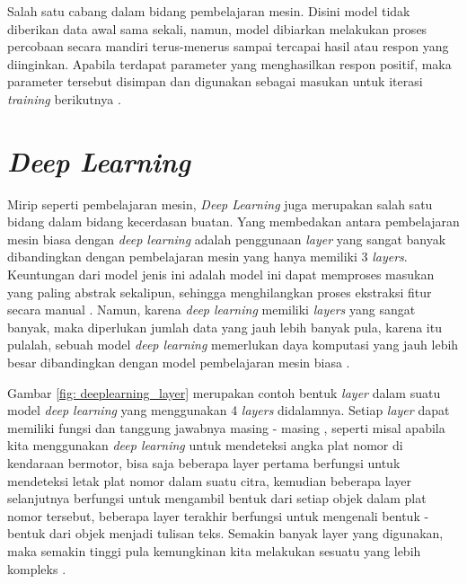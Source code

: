 Salah satu cabang dalam bidang pembelajaran mesin. Disini model tidak diberikan data awal sama sekali, namun, model dibiarkan melakukan proses percobaan secara mandiri terus-menerus sampai tercapai hasil atau respon yang diinginkan. Apabila terdapat parameter yang menghasilkan respon positif, maka parameter tersebut disimpan dan digunakan sebagai masukan untuk iterasi \textit{training} berikutnya \cite{mit_ml_expl}.

\section{\textit{Deep Learning}}

Mirip seperti pembelajaran mesin, \textit{Deep Learning} juga merupakan salah satu bidang dalam bidang kecerdasan buatan. Yang membedakan antara pembelajaran mesin biasa dengan \textit{deep learning} adalah penggunaan \textit{layer} yang sangat banyak dibandingkan dengan pembelajaran mesin yang hanya memiliki 3 \textit{layers}. Keuntungan dari model jenis ini adalah model ini dapat memproses masukan yang paling abstrak sekalipun, sehingga menghilangkan proses ekstraksi fitur secara manual \cite{mathwork_deeplearning}. Namun, karena \textit{deep learning} memiliki \textit{layers} yang sangat banyak, maka diperlukan jumlah data yang jauh lebih banyak pula, karena itu pulalah, sebuah model \textit{deep learning} memerlukan daya komputasi yang jauh lebih besar dibandingkan dengan model pembelajaran mesin biasa \cite{mit_ml_expl}.

Gambar \ref{fig: deeplearning_layer} merupakan contoh bentuk \textit{layer} dalam suatu model \textit{deep learning} yang menggunakan 4 \textit{layers} didalamnya. Setiap \textit{layer} dapat memiliki fungsi dan tanggung jawabnya masing - masing \cite{mit_ml_expl}, seperti misal apabila kita menggunakan \textit{deep learning} untuk mendeteksi angka plat nomor di kendaraan bermotor, bisa saja beberapa layer pertama berfungsi untuk mendeteksi letak plat nomor dalam suatu citra, kemudian beberapa layer selanjutnya berfungsi untuk mengambil bentuk dari setiap objek dalam plat nomor tersebut, beberapa layer terakhir berfungsi untuk mengenali bentuk - bentuk dari objek menjadi tulisan teks. Semakin banyak layer yang digunakan, maka semakin tinggi pula kemungkinan kita melakukan sesuatu yang lebih kompleks \cite{mit_ml_expl}.

